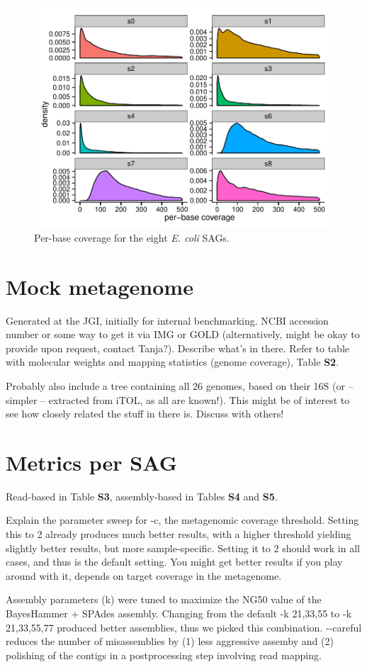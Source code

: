 \documentclass{bioinfo2}
\begin{document}
\begin{figure}[h]
\centering
\includegraphics[width=.5\textwidth]{sag_depth}
\caption{Per-base coverage for the eight \textit{E. coli} SAGs.}
\end{figure}

\section{Mock metagenome}

Generated at the JGI, initially for internal benchmarking. NCBI accession number or some way to get it via IMG or GOLD (alternatively, might be okay to provide upon request, contact Tanja?). Describe what's in there. Refer to table with molecular weights and mapping statistics (genome coverage), Table \textbf{S2}.

Probably also include a tree containing all 26 genomes, based on their 16S (or -- simpler -- extracted from iTOL, as all are known!). This might be of interest to see how closely related the stuff in there is. Discuss with others!

\section{Metrics per SAG}

Read-based in Table \textbf{S3}, assembly-based in Tables \textbf{S4} and \textbf{S5}.

Explain the parameter sweep for -c, the metagenomic coverage threshold. Setting this to 2 already produces much better results, with a higher threshold yielding slightly better results, but more sample-specific. Setting it to 2 should work in all cases, and thus is the default setting. You might get better results if you play around with it, depends on target coverage in the metagenome.

Assembly parameters (k) were tuned to maximize the NG50 value of the BayesHammer + SPAdes assembly. Changing from the default -k 21,33,55 to -k 21,33,55,77 produced better assemblies, thus we picked this combination. -{}-careful reduces the number of misassemblies by (1) less aggressive assemby and (2) polishing of the contigs in a postprocessing step involving read mapping.
\end{document}
